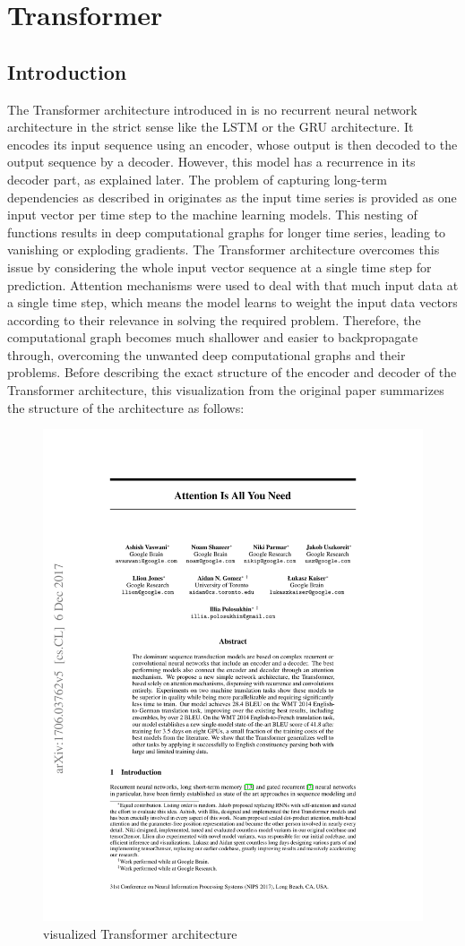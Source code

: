 \documentclass[draft,final]{vutinfth} %
\begin{document}
    \section{Transformer} \label{transformer}

    \subsection{Introduction}
    The Transformer architecture introduced in \cite{Transformer} is no recurrent neural network architecture in the strict sense like the LSTM or the GRU architecture.
    It encodes its input sequence using an encoder, whose output is then decoded to the output sequence by a decoder.
    However, this model has a recurrence in its decoder part, as explained later.
    The problem of capturing long-term dependencies as described in  originates as the input time series is provided as one input vector per time step to the machine learning models.
    This nesting of functions results in deep computational graphs for longer time series, leading to vanishing or exploding gradients.
    The Transformer architecture overcomes this issue by considering the whole input vector sequence at a single time step for prediction.
    Attention mechanisms were used to deal with that much input data at a single time step, which means the model learns to weight the input data vectors according to their relevance in solving the required problem.
    Therefore, the computational graph becomes much shallower and easier to backpropagate through, overcoming the unwanted deep computational graphs and their problems.
    Before describing the exact structure of the encoder and decoder of the Transformer architecture, this visualization from the original paper summarizes the structure of the architecture as follows:
    \begin{figure}[H]
        \centering{}
        \includegraphics[page=3,width=0.6\linewidth,trim={196 398 196 71},clip]{literature/attention_is_all_you_need.pdf}
        \caption{visualized Transformer architecture \cite[p. 3]{Transformer}}
        \label{fig:transformer_vis}
    \end{figure}
\end{document}
